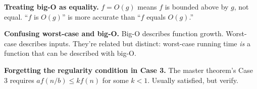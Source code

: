 \begin{commonmistake}
\textbf{Treating big-O as equality.} $f = O(g)$ means $f$ is bounded above by $g$, not equal. ``$f$ is $O(g)$'' is more accurate than ``$f$ equals $O(g)$.''
\end{commonmistake}

\begin{commonmistake}
\textbf{Confusing worst-case and big-O.} Big-O describes function growth. Worst-case describes inputs. They're related but distinct: worst-case running time \emph{is} a function that can be described with big-O.
\end{commonmistake}

\begin{commonmistake}
\textbf{Forgetting the regularity condition in Case 3.} The master theorem's Case 3 requires $af(n/b) \leq kf(n)$ for some $k < 1$. Usually satisfied, but verify.
\end{commonmistake}

